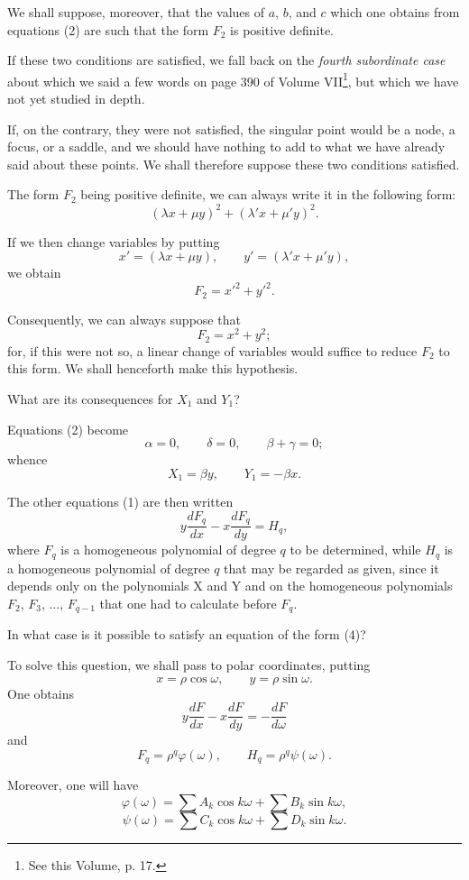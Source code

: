 \documentclass[11pt]{article}
\begin{document}
We shall suppose, moreover, that the values of $a$, $b$, and $c$ which one obtains from equations (2) are such that the form $F_2$ is positive definite.

If these two conditions are satisfied, we fall back on the \emph{fourth subordinate case} about which we said a few words on page 390 of Volume VII\footnote{See this Volume, p. 17.}, but which we have not yet studied in depth.

If, on the contrary, they were not satisfied, the singular point would be a node, a focus, or a saddle, and we should have nothing to add to what we have already said about these points. We shall therefore suppose these two conditions satisfied.

The form $F_2$ being positive definite, we can always write it in the following form:
\[
(\lambda x+\mu y)^2+(\lambda' x+\mu' y)^2.
\]

If we then change variables by putting
\[
x'=(\lambda x+\mu y),
\qquad
y'=(\lambda'x+\mu'y),
\]
we obtain
\[
F_2=x'^2+y'^2.
\]

Consequently, we can always suppose that
\[
F_2=x^2+y^2;
\]
for, if this were not so, a linear change of variables would suffice to reduce $F_2$ to this form. We shall henceforth make this hypothesis.

What are its consequences for $X_1$ and $Y_1$?

Equations (2) become
\[
\alpha=0,
\qquad
\delta=0,
\qquad
\beta+\gamma=0;
\]
whence
\[
X_1=\beta y,
\qquad
Y_1=-\beta x.
\]

The other equations (1) are then written
\begin{equation}\tag{4}
y\frac{dF_q}{dx}-x\frac{dF_q}{dy}=H_q,
\end{equation}
where $F_q$ is a homogeneous polynomial of degree $q$ to be determined, while $H_q$ is a homogeneous polynomial of degree $q$ that may be regarded as given, since it depends only on the polynomials X and Y and on the homogeneous polynomials $F_2$, $F_3$, $\ldots$, $F_{q-1}$ that one had to calculate before $F_q$.

In what case is it possible to satisfy an equation of the form (4)?

To solve this question, we shall pass to polar coordinates, putting
\[
x=\rho\cos\omega,
\qquad
y=\rho\sin\omega.
\]
One obtains
\[
y\frac{dF}{dx}-x\frac{dF}{dy}=-\frac{dF}{d\omega}
\]
and
\[
F_q=\rho^q\varphi(\omega),
\qquad
H_q=\rho^q\psi(\omega).
\]

Moreover, one will have
\[
\varphi(\omega)=\sum A_k\cos k\omega+\sum B_k\sin k\omega,
\]
\[
\psi(\omega)=\sum C_k\cos k\omega+\sum D_k\sin k\omega.
\]
\end{document}

